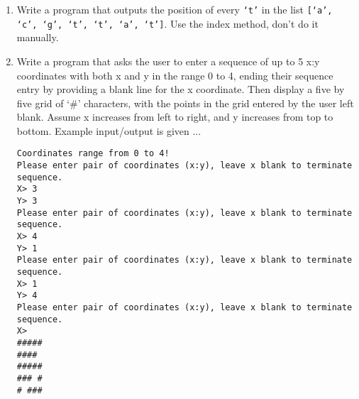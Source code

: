 \begin{enumerate}
	\item Write a program that outputs the position of every \texttt{`t'} in the    list \texttt{[`a', `c', `g', `t', `t', `a', `t']}. Use the index method,    don't do it manually.
	\item Write a program that asks the user to enter a sequence of up to    5 x:y coordinates with both x and y in the range 0 to 4, ending    their sequence entry by providing a blank line for the x    coordinate. Then display a five by five grid of `\#' characters,    with the points in the grid entered by the user left blank. Assume    x increases from left to right, and y increases from top to bottom.    Example input/output is given ...          
\begin{lstlisting}
Coordinates range from 0 to 4!
Please enter pair of coordinates (x:y), leave x blank to terminate sequence.
X> 3
Y> 3
Please enter pair of coordinates (x:y), leave x blank to terminate sequence.
X> 4
Y> 1
Please enter pair of coordinates (x:y), leave x blank to terminate sequence.
X> 1
Y> 4
Please enter pair of coordinates (x:y), leave x blank to terminate sequence.
X>
#####
#### 
#####
### #
# ###
\end{lstlisting}
\end{enumerate}
